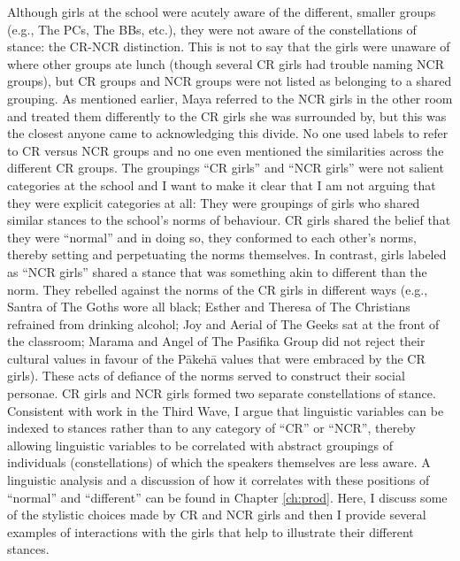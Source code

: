 \largerpage[-1]
Although girls at the school were acutely aware of the different, smaller groups (e.g., The PCs, The BBs, etc.), they were not aware of the constellations of stance: the CR-NCR distinction. This is not to say that the girls were unaware of where other groups ate lunch (though several CR girls had trouble naming NCR groups), but CR groups and NCR groups were not listed as belonging to a shared grouping.  As mentioned earlier, Maya referred to the NCR girls in the other room and treated them differently to the CR girls she was surrounded by, but this was the closest anyone came to acknowledging this divide. No one used labels to refer to CR versus NCR groups and no one even mentioned the similarities across the different CR groups. The groupings ``CR girls'' and ``NCR girls'' were not salient categories at the school and I want to make it clear that I am not arguing that they were explicit categories at all: They were groupings of girls who shared similar stances to the school's norms of behaviour. CR girls shared the belief that they were ``normal'' and in doing so, they conformed to each other's norms, thereby setting and perpetuating the norms themselves. In contrast, girls labeled as ``NCR girls'' shared a stance that was something akin to different than the norm. They rebelled against the norms of the CR girls in different ways (e.g., Santra of The Goths wore all black; Esther and Theresa of The Christians refrained from drinking alcohol; Joy and Aerial of The Geeks sat at the front of the classroom; Marama and Angel of The Pasifika Group did not reject their cultural values in favour of the P\=akeh\=a values that were embraced by the CR girls). These acts of defiance of the norms served to construct their social personae. CR girls and NCR girls formed two separate constellations of stance. Consistent with work in the Third Wave, I argue that linguistic variables can be indexed to stances rather than to any category of ``CR'' or ``NCR'', thereby allowing linguistic variables to be correlated with abstract groupings of individuals (constellations) of which the speakers themselves are less aware. A linguistic analysis and a discussion of how it correlates with these positions of ``normal'' and ``different'' can be found in Chapter \ref{ch:prod}. Here, I discuss some of the stylistic choices made by CR and NCR girls and then I provide several examples of interactions with the girls that help to illustrate their different stances. 

